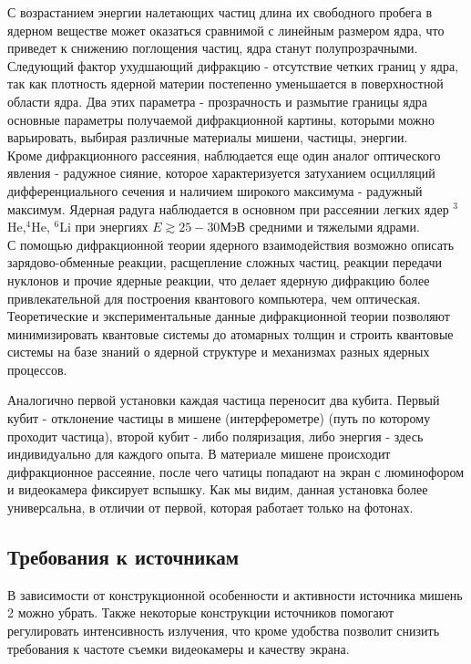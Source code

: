 \documentclass[11pt]{report}
\begin{document}
С возрастанием энергии налетающих частиц длина их свободного пробега в ядерном веществе может оказаться сравнимой с линейным размером ядра, что приведет к снижению поглощения частиц, ядра станут полупрозрачными. Следующий фактор ухудшающий дифракцию - отсутствие четких границ у ядра, так как плотность ядерной материи постепенно уменьшается в поверхностной области ядра. Два этих параметра - прозрачность и размытие границы ядра основные параметры получаемой дифракционной картины, которыми можно варьировать, выбирая различные материалы мишени, частицы, энергии. \\

Кроме дифракционного рассеяния, наблюдается еще один аналог оптического явления - радужное сияние, которое характеризуется затуханием осцилляций дифференциального сечения и наличием широкого максимума - радужный максимум. Ядерная радуга наблюдается в основном при рассеянии легких ядер $^3$He,$^4$He, $^6$Li при энергиях $E\gtrsim 25-30$МэВ средними и тяжелыми ядрами. \\

С помощью дифракционной теории ядерного взаимодействия возможно описать зарядово-обменные реакции, расщепление сложных частиц, реакции передачи нуклонов и прочие ядерные реакции, что делает ядерную дифракцию более привлекательной для построения квантового компьютера, чем оптическая. Теоретические и экспериментальные данные дифракционной теории позволяют минимизировать квантовые системы до атомарных толщин и строить квантовые системы на базе знаний о ядерной структуре и механизмах разных ядерных процессов.

Аналогично первой установки каждая частица переносит два кубита. Первый кубит - отклонение частицы в мишене (интерферометре) (путь по которому проходит частица), второй кубит - либо поляризация, либо энергия - здесь индивидуально для каждого опыта. В материале мишене происходит дифракционное рассеяние, после чего чатицы попадают на экран с люминофором и видеокамера фиксирует вспышку. Как мы видим, данная установка более универсальна, в отличии от первой, которая работает только на фотонах.

\subsection{Требования к источникам}
В зависимости от конструкционной особенности и активности источника мишень 2 можно убрать. Также некоторые конструкции источников помогают регулировать интенсивность излучения, что кроме удобства позволит снизить требования к частоте съемки видеокамеры и качеству экрана. \\
\end{document}
